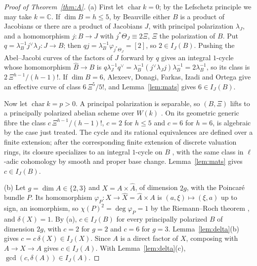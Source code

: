 \documentclass[11pt,a4paper]{article}
\theoremstyle{definition}
\newcommand{\C}{\mathbb{C}}
\renewcommand{\IJ}{I_J}
\begin{document}
\begin{proof}[Proof of Theorem~\ref{thm:A}]
(a) First let $\operatorname{char}k=0$; by the Lefschetz principle we may
take $k=\C$. If $\dim B=h\le5$, by Beauville \cite[Prop.~2.2,
Thm.~5.4, Thm.~6.5(i)]{Be} either $B$ is a product of Jacobians or there are
a product of Jacobians $J$, with principal polarization $\lambda_J$, and a
homomorphism $j\colon B\to J$ with $j^*\Theta_J\equiv2\Xi$, $\Xi$ the
polarization of $B$. Put $q=\lambda_B^{-1}j^\vee\lambda_J\colon J\to B$; then
$qj=\lambda_B^{-1}\varphi_{j^*\Theta_J}=[2]$, so $2\in\IJ(B)$. Pushing the
Abel--Jacobi curves of the factors of $J$ forward by $q$ gives an integral
$1$-cycle whose homomorphism $\widehat B\to B$ is
$q\lambda_J^{-1}q^\vee=\lambda_B^{-1}(j^\vee\lambda_Jj)\lambda_B^{-1}
=2\lambda_B^{-1}$, so its class is $2\,\Xi^{h-1}/(h-1)!$. If $\dim B=6$,
Alexeev, Donagi, Farkas, Izadi and Ortega \cite[Cor.~2, p.~165]{ADFIO}
give an effective curve of class $6\,\Xi^5/5!$, and Lemma~\ref{lem:mats}
gives $6\in\IJ(B)$.

Now let $\operatorname{char}k=p>0$. A principal polarization is separable,
so $(B,\Xi)$ lifts to a principally polarized abelian scheme over $W(k)$
\cite[Cor.~2.4.2 and its proof, p.~287]{Oo}. On its geometric generic fibre
the class $c\,\Xi^{h-1}/(h-1)!$, $c=2$ for $h\le5$ and $c=6$ for $h=6$, is
algebraic by the case just treated. The cycle and its rational equivalences
are defined over a finite extension; after the corresponding finite
extension of discrete valuation rings, its closure specializes to an
integral $1$-cycle on $B$ \cite[Ex.~20.3.5, p.~400]{Fu}, with the same class
in $\ell$-adic cohomology by smooth and proper base change. Lemma~\ref{lem:mats}
gives $c\in\IJ(B)$.

(b) Let $g=\dim A\in\{2,3\}$ and $X=A\times\widehat A$, of dimension $2g$,
with the Poincar\'e bundle $P$. Its homomorphism
$\varphi_P\colon X\to\widehat X=\widehat A\times A$ is $(a,\xi)\mapsto
(\xi,a)$ up to sign, an isomorphism, so $\chi(P)^2=\deg\varphi_P=1$ by the
Riemann--Roch theorem \cite[\S16]{Mu}, and $\delta(X)=1$. By (a), $c\in\IJ(B)$
for every principally polarized $B$ of dimension $2g$, with $c=2$ for $g=2$
and $c=6$ for $g=3$. Lemma~\ref{lem:delta}(b) gives
$c=c\,\delta(X)\in\IJ(X)$. Since $A$ is a direct factor of $X$, composing
with $A\to X\to A$ gives $c\in\IJ(A)$. With Lemma~\ref{lem:delta}(c),
$\gcd(c,\delta(A))\in\IJ(A)$.
\end{proof}
\end{document}
